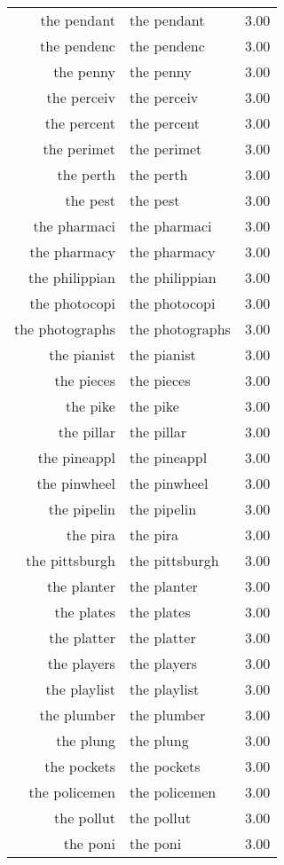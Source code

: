 \begin{table}[ht]
\begin{tabular}{rlr}
  the pendant & the pendant & 3.00 \\ 
  the pendenc & the pendenc & 3.00 \\ 
  the penny & the penny & 3.00 \\ 
  the perceiv & the perceiv & 3.00 \\ 
  the percent & the percent & 3.00 \\ 
  the perimet & the perimet & 3.00 \\ 
  the perth & the perth & 3.00 \\ 
  the pest & the pest & 3.00 \\ 
  the pharmaci & the pharmaci & 3.00 \\ 
  the pharmacy & the pharmacy & 3.00 \\ 
  the philippian & the philippian & 3.00 \\ 
  the photocopi & the photocopi & 3.00 \\ 
  the photographs & the photographs & 3.00 \\ 
  the pianist & the pianist & 3.00 \\ 
  the pieces & the pieces & 3.00 \\ 
  the pike & the pike & 3.00 \\ 
  the pillar & the pillar & 3.00 \\ 
  the pineappl & the pineappl & 3.00 \\ 
  the pinwheel & the pinwheel & 3.00 \\ 
  the pipelin & the pipelin & 3.00 \\ 
  the pira & the pira & 3.00 \\ 
  the pittsburgh & the pittsburgh & 3.00 \\ 
  the planter & the planter & 3.00 \\ 
  the plates & the plates & 3.00 \\ 
  the platter & the platter & 3.00 \\ 
  the players & the players & 3.00 \\ 
  the playlist & the playlist & 3.00 \\ 
  the plumber & the plumber & 3.00 \\ 
  the plung & the plung & 3.00 \\ 
  the pockets & the pockets & 3.00 \\ 
  the policemen & the policemen & 3.00 \\ 
  the pollut & the pollut & 3.00 \\ 
  the poni & the poni & 3.00 \\ 

\end{tabular}
\end{table}
